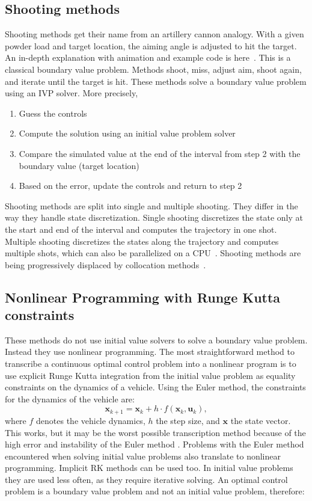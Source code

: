 \subsection{Shooting methods}
Shooting methods get their name from an artillery cannon analogy. With a given powder load and target location, the aiming angle is adjusted to hit the target. An in-depth explanation with animation and example code is here~\cite{kelly_cannon}. This is a classical boundary value problem. Methods shoot, miss, adjust aim, shoot again, and iterate until the target is hit. These methods solve a boundary value problem using an IVP solver. More precisely,
\begin{enumerate}
  \item Guess the controls
  \item Compute the solution using an initial value problem solver
  \item Compare the simulated value at the end of the interval from step 2 with the boundary value (target location)
  \item Based on the error, update the controls and return to step 2
\end{enumerate}

Shooting methods are split into single and multiple shooting. They differ in the way they handle state discretization. Single shooting discretizes the state only at the start and end of the interval and computes the trajectory in one shot. Multiple shooting discretizes the states along the trajectory and computes multiple shots, which can also be parallelized on a CPU~\cite{FANG2022110926}. Shooting methods are being progressively displaced by collocation methods~\cite{raoSurveyNumericalMethods2010}.

\subsection{Nonlinear Programming with Runge Kutta constraints}
These methods do not use initial value solvers to solve a boundary value problem. Instead they use nonlinear programming.
The most straightforward method to transcribe a continuous optimal control problem
into a nonlinear program is to use explicit Runge Kutta integration from the
initial value problem as equality constraints on the dynamics of a vehicle. Using
the Euler method, the constraints for the dynamics of the vehicle are:
\begin{equation}
    \mathbf{x}_{k+1} = \mathbf{x}_k + h \cdot f(\mathbf{x}_k, \mathbf{u}_k),
\end{equation}
where $f$ denotes the vehicle dynamics, $h$ the step size, and $\mathbf{x}$ the state vector.
This works, but it may be the worst possible transcription method because of the high error and instability of the Euler method \cite{SolvingOrdinaryDifferential1987}. Problems with the Euler method encountered when solving initial value problems also translate to nonlinear programming. Implicit RK methods can be used too. In initial value problems they are used less often, as they require iterative solving. An optimal control problem is a boundary value problem and not an initial value problem, therefore:

